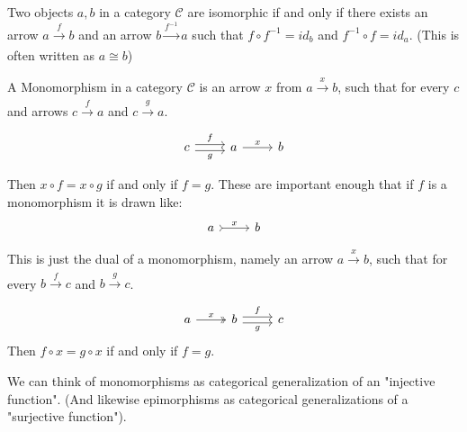 \begin{definition*}[Isomorphism]
    Two objects $a,b$ in a category $\mathcal{C}$ are isomorphic if and only if there exists an arrow $a \xrightarrow[]{f} b$ and an arrow $b \xrightarrow[]{f^{-1}} a$ such that $f \circ f^{-1} = id_b$ and $f^{-1} \circ f = id_a$. (This is often written as $a \cong b$)
\end{definition*}
\begin{definition}[Monomorphism]
    A Monomorphism in a category $\mathcal{C}$ is an arrow $x$ from $a \xrightarrow[]{x} b$, such that for every $c$ and arrows $c \xrightarrow[]{f} a$ and $c \xrightarrow[]{g} a$. 
\[\begin{tikzcd}
	c & a & b
	\arrow["f", shift left, from=1-1, to=1-2]
	\arrow["g"', shift right, from=1-1, to=1-2]
	\arrow["x", from=1-2, to=1-3]
\end{tikzcd}\]
    
    Then $ x \circ f = x \circ g$ if and only if $f=g$. These are important enough that if $f$ is a monomorphism it is drawn like:
    \[\begin{tikzcd}
	a & b
	\arrow["x", tail, from=1-1, to=1-2]
\end{tikzcd}\]
\end{definition}
\begin{definition}[Epimorphism]
    This is just the dual of a monomorphism, namely an arrow $a \xrightarrow[]{x} b$, such that for every  $b \xrightarrow[]{f} c$ and $b \xrightarrow[]{g} c$. 
\[\begin{tikzcd}
	a & b & c
	\arrow["x", two heads, from=1-1, to=1-2]
	\arrow["f", shift left, from=1-2, to=1-3]
	\arrow["g"', shift right, from=1-2, to=1-3]
\end{tikzcd}\]
Then $ f \circ x = g \circ x$ if and only if $f=g$.
\end{definition}
We can think of monomorphisms as categorical generalization of an "injective function". (And likewise epimorphisms as categorical generalizations of a "surjective function").



